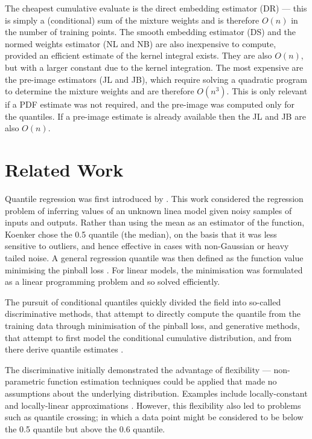 \documentclass[twoside]{article} \usepackage{aistats2017}
\theoremstyle{definition}
\begin{document}
	The cheapest cumulative evaluate is the direct embedding estimator (DR) --- this is simply a (conditional) sum of the mixture weights and is therefore $O(n)$ in the number of training points. The smooth embedding estimator (DS) and the normed weights estimator (NL and NB) are also inexpensive to compute, provided an efficient estimate of the kernel integral exists. They are also $O(n)$, but with a larger constant due to the kernel integration. The most expensive are the pre-image estimators (JL and JB), which require solving a quadratic program to determine the mixture weights and are therefore $O(n^3)$. This is only relevant if a PDF estimate was not required, and the pre-image was computed only for the quantiles. If a pre-image estimate is already available then the JL and JB are also $O(n)$.
	
\section{Related Work}
\label{sec:related_work}

	Quantile regression was first introduced by \cite{Koenker1978}. This work considered the regression problem of inferring values of an unknown linea model given noisy samples of inputs and outputs. Rather than using the mean as an estimator of the function, Koenker chose the 0.5 quantile (the median), on the basis that it was less sensitive to outliers, and hence effective in cases with non-Gaussian or heavy tailed noise. A general regression quantile was then defined as the function value minimising the pinball loss \citep{Koenker1978}. For linear models, the minimisation was formulated as a linear programming problem and so solved efficiently.
	
	The pursuit of conditional quantiles quickly divided the field into so-called discriminative methods, that attempt to directly compute the quantile from the training data through minimisation of the pinball loss, and generative methods, that attempt to first model the conditional cumulative distribution, and from there derive quantile estimates \citep{Koenker2005}.
	
	The discriminative initially demonstrated the advantage of flexibility --- non-parametric function estimation techniques could be applied that made no assumptions about the underlying distribution. Examples include locally-constant and locally-linear approximations \citep{Chaudhuri1991, Yu1998}. However, this flexibility also led to problems such as quantile crossing; in which a data point might be considered to be below the 0.5 quantile but above the 0.6 quantile\cite{Koenker2005}. 
	
\end{document}
